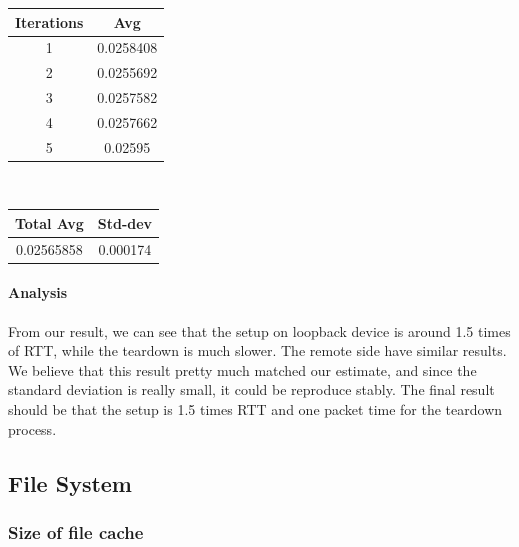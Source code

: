 \begin{enumerate}
\begin{center}
            \begin{tabular}{||c c||} 
                 \hline
                 Iterations & Avg \\ [0.5ex] 
                 \hline\hline
                 1 & 0.0258408  \\ 
                 \hline
                 2 & 0.0255692  \\ 
                 \hline
                 3 & 0.0257582  \\ 
                 \hline
                 4 & 0.0257662 \\ 
                 \hline
                 5 & 0.02595   \\ 
                 \hline
                 \hline
                \end{tabular} \\
                \begin{tabular}{||c c||} 
                 \hline
                 Total Avg & Std-dev \\ [0.5ex] 
                 \hline\hline
                 0.02565858 & 0.000174 \\ 
                 \hline
                \hline
            \end{tabular}
        \end{center}
\end{enumerate}

\paragraph{Analysis}

From our result, we can see that the setup on loopback device is around 1.5 times of RTT, while the teardown is much slower. The remote side have similar results. We believe that this result pretty much matched our estimate, and since the standard deviation is really small, it could be reproduce stably. The final result should be that the setup is 1.5 times RTT and one packet time for the teardown process.

\subsection{File System}


\subsubsection{Size of file cache}


